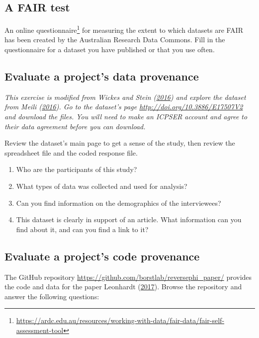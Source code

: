 \documentclass[
]{krantz}
\providecommand{\tightlist}{%
  \setlength{\itemsep}{0pt}\setlength{\parskip}{0pt}}
\renewcommand{\href}[2]{#2\footnote{\url{#1}}}
\begin{document}
\hypertarget{provenance-ex-fair-test}{%
\subsection{A FAIR test}\label{provenance-ex-fair-test}}

An \href{https://ardc.edu.au/resources/working-with-data/fair-data/fair-self-assessment-tool}{online questionnaire}
for measuring the extent to which datasets are FAIR
has been created by the Australian Research Data Commons.
Fill in the questionnaire for a dataset you have published or that you use often.

\hypertarget{provenance-ex-understand-project}{%
\subsection{Evaluate a project's data provenance}\label{provenance-ex-understand-project}}

\emph{This exercise is modified from Wickes and Stein (\protect\hyperlink{ref-Wick2016}{2016}) and explore the dataset from Meili (\protect\hyperlink{ref-Meil2015}{2016}).
Go to the dataset's page \url{http://doi.org/10.3886/E17507V2} and download the files.
You will need to make an ICPSER account and agree to their data agreement before you can download.}

Review the dataset's main page to get a sense of the study,
then review the spreadsheet file and the coded response file.

\begin{enumerate}
\def\labelenumi{\arabic{enumi}.}
\tightlist
\item
  Who are the participants of this study?
\item
  What types of data was collected and used for analysis?
\item
  Can you find information on the demographics of the interviewees?
\item
  This dataset is clearly in support of an article.
  What information can you find about it, and can you find a link to it?
\end{enumerate}

\hypertarget{provenance-ex-eval-code}{%
\subsection{Evaluate a project's code provenance}\label{provenance-ex-eval-code}}

The GitHub repository \url{https://github.com/borstlab/reversephi_paper/} provides the code and data for the paper Leonhardt (\protect\hyperlink{ref-Leon2017}{2017}).
Browse the repository and answer the following questions:
\end{document}

